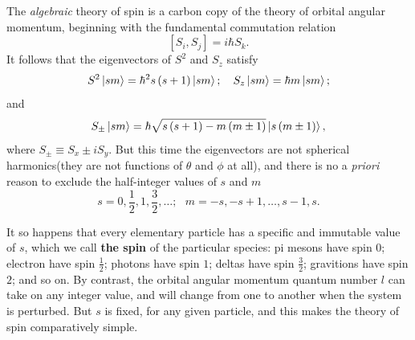 The \textit{algebraic} theory of spin is a carbon copy of the theory of orbital angular momentum, beginning with the fundamental commutation relation
\begin{equation}
  \label{eq:4-95}
  \left[ S_i, S_j \right] = i\hbar S_k .
\end{equation}
It follows that the eigenvectors of $S^2$ and $S_z$ satisfy
\begin{equation}
  \label{eq:4-96}
  S^2 \ket{sm} = \hbar^2 s \left( s+1 \right) \ket{sm}; ~ ~ ~ S_z \ket{sm} = \hbar m \ket{sm};
\end{equation}
and
\begin{equation}
  \label{eq:4-97}
  S_{\pm} \ket{sm} = \hbar \sqrt{s \left( s+1 \right) - m \left( m \pm 1 \right)} \ket{s \left(m \pm 1 \right)} ,
\end{equation}
where $S_{\pm} \equiv S_x \pm i S_y$.
But this time the eigenvectors are not spherical harmonics(they are not functions of $\theta$ and $\phi$ at all), and there is no a \textit{priori} reason to exclude the half-integer values of $s$ and $m$
\begin{equation}
  \label{eq:4-98}
  s = 0, \frac{1}{2}, 1, \frac{3}{2}, \ldots ; ~ ~ ~  m=-s, -s+1, \ldots, s-1, s.
\end{equation}

It so happens that every elementary particle has a specific and immutable value of $s$, which we call \textbf{the spin} of the particular species: pi mesons have spin $0$; electron have spin $\frac{1}{2}$; photons have spin $1$; deltas have spin $\frac{3}{2}$; gravitions have spin  $2$; and so on.
By contrast, the orbital angular momentum quantum number $l$ can take on any integer value, and will change from one to another when the system is perturbed.
But $s$ is fixed, for any given particle, and this makes the theory of spin comparatively simple.

